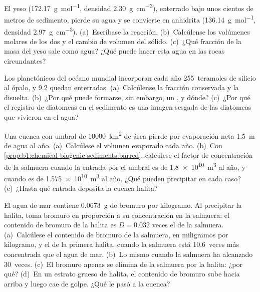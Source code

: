 \begin{exercise}[$\star\star$]\label{exo:b1:chemical-biogenic-sediments:8}
El yeso  (\qty{172.17}{g.mol^{-1}}, densidad \qty{2.30}{g.cm^{-3}}), enterrado bajo unos cientos de metros de sedimento, pierde su agua y se convierte en anhidrita 
(\qty{136.14}{g.mol^{-1}}, densidad \qty{2.97}{g.cm^{-3}}). (a)~Escríbase la reacción. (b)~Calcúlense los volúmenes molares de los dos  y el cambio de volumen del sólido.
(c)~¿Qué fracción de la masa del yeso sale como agua? ¿Qué puede hacer esta agua en las rocas circundantes?
\end{exercise}

\begin{exercise}[$\star\star$]\label{exo:b1:chemical-biogenic-sediments:9}
Los planctónicos del océano mundial incorporan cada año 255~teramoles de silicio al ópalo, y 9.2 quedan enterradas. (a)~Calcúlense la fracción conservada y la disuelta. (b)~¿Por qué puede
formarse, sin embargo, un , y dónde? (c)~¿Por qué el registro de diatomeas en el sedimento es una imagen sesgada de las diatomeas que vivieron en el agua?
\end{exercise}

\begin{exercise}[$\star\star\star$]\label{exo:b1:chemical-biogenic-sediments:10}
Una cuenca con umbral de \qty{10000}{km^2} de área pierde por evaporación neta \qty{1.5}{m} de agua al año. (a)~Calcúlese el volumen evaporado cada año. (b)~Con
\cref{prop:b1:chemical-biogenic-sediments:barred}, calcúlese el factor de concentración de la salmuera cuando la entrada por el umbral es de \qty{1.8e10}{m^3} al año,
y cuando es de \qty{1.575e10}{m^3} al año. ¿Qué  pueden precipitar en cada caso? (c)~¿Hasta qué entrada deposita la cuenca halita?
\end{exercise}

\begin{exercise}[$\star\star\star$]\label{exo:b1:chemical-biogenic-sediments:11}
El agua de mar contiene \qty{0.0673}{g} de bromuro por kilogramo. Al precipitar la halita, toma bromuro en proporción a su concentración en la salmuera: el contenido de bromuro de la halita es
$D = 0.032$ veces el de la salmuera. (a)~Calcúlese el contenido de bromuro de la salmuera, en miligramos por kilogramo, y el de la primera halita, cuando la salmuera está 10.6~veces más concentrada que el
agua de mar. (b)~Lo mismo cuando la salmuera ha alcanzado 30~veces. (c)~El bromuro apenas se elimina de la salmuera por la halita: ¿por qué? (d)~En un estrato grueso de halita, el contenido de bromuro
sube hacia arriba y luego cae de golpe. ¿Qué le pasó a la cuenca?
\end{exercise}

